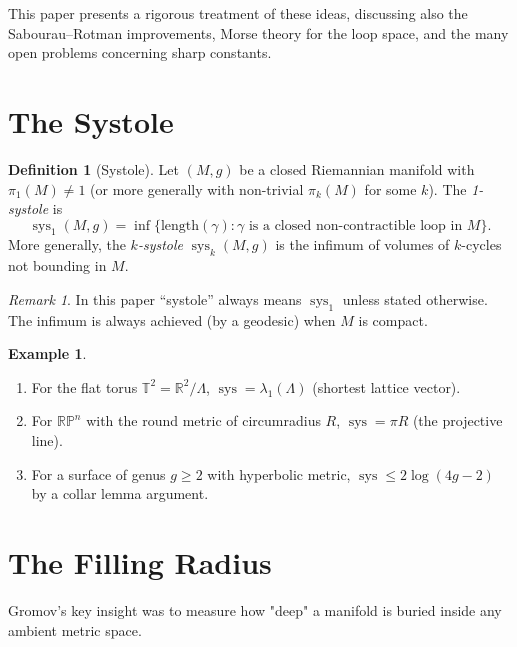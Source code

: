 \documentclass[12pt,a4paper]{amsart}
\theoremstyle{definition}
\newtheorem{definition}[theorem]{Definition}
\newtheorem{example}[theorem]{Example}
\theoremstyle{remark}
\newtheorem{remark}[theorem]{Remark}
\DeclareMathOperator{\sys}{sys}
\newcommand{\RR}{\mathbb{R}}
\newcommand{\RP}{\mathbb{RP}}
\newcommand{\TT}{\mathbb{T}}
\begin{document}
This paper presents a rigorous treatment of these ideas, discussing also
the Sabourau--Rotman improvements, Morse theory for the loop space, and the
many open problems concerning sharp constants.

\section{The Systole}

\begin{definition}[Systole]
Let $(M,g)$ be a closed Riemannian manifold with $\pi_1(M) \neq 1$ (or more
generally with non-trivial $\pi_k(M)$ for some $k$).  The
\emph{1-systole} is
\[
  \sys_1(M,g) = \inf\bigl\{ \mathrm{length}(\gamma) : \gamma \text{ is a
  closed non-contractible loop in } M \bigr\}.
\]
More generally, the \emph{$k$-systole} $\sys_k(M,g)$ is the infimum of
volumes of $k$-cycles not bounding in $M$.
\end{definition}

\begin{remark}
In this paper ``systole'' always means $\sys_1$ unless stated otherwise.
The infimum is always achieved (by a geodesic) when $M$ is compact.
\end{remark}

\begin{example}
\begin{enumerate}[label=(\roman*)]
  \item For the flat torus $\TT^2 = \RR^2/\Lambda$, $\sys = \lambda_1(\Lambda)$
        (shortest lattice vector).
  \item For $\RP^n$ with the round metric of circumradius $R$,
        $\sys = \pi R$ (the projective line).
  \item For a surface of genus $g \ge 2$ with hyperbolic metric,
        $\sys \le 2\log(4g-2)$ by a collar lemma argument.
\end{enumerate}
\end{example}

\section{The Filling Radius}

Gromov's key insight was to measure how "deep" a manifold is buried inside
any ambient metric space.
\end{document}
